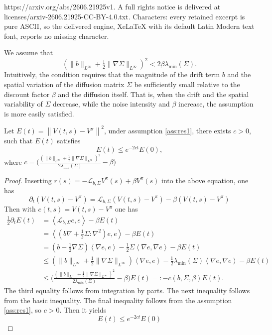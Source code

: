 \documentclass[10pt,a4paper]{amsart}
\def\lam{\lambda}
\def\la{\left\langle}
\def\ll{\left\lVert}
\def\mL{\mathcal{L}_{b,\Sigma}}
\def\pt{\partial}
\def\ra{\right\rangle}
\def\rl{\right\rVert}
\begin{document}
https://arxiv.org/abs/2606.21925v1. A full rights notice is delivered at licenses/arxiv-2606.21925-CC-BY-4.0.txt. Characters: every retained excerpt is pure ASCII, so the delivered engine, XeLaTeX with its default Latin Modern text font, reports no missing character.
\begin{assumption}\label{ass:res1}
We assume that
\[
   \left( \|b\|_{L^\infty} + \tfrac{1}{2} \|\nabla\Sigma\|_{L^\infty}\right)^2 
   < 2\beta \lambda_{\min}(\Sigma).
\]
Intuitively, the condition requires that the magnitude of the drift term $b$ and the spatial variation of the diffusion matrix $\Sigma$ be sufficiently small relative to the discount factor $\beta$ and the diffusion itself. That is, when the drift and the spatial variability of $\Sigma$ decrease, while the noise intensity and $\beta$ increase, the assumption is more easily satisfied.

\end{assumption}

\begin{lemma}
    Let $E(t) = \ll V(t,s)- V^\pi \rl^2$, under assumption \ref{ass:res1}, there exists $c > 0$, such that $E(t)$ satisfies
    \[
    E(t) \leq e^{-2c t}E(0),
    \]
    where $c = \bigg(\frac{(\|b\|_{L^\infty} + \tfrac{1}{2} \|\nabla\Sigma\|_{L^\infty})^2}{2\lam_{\min}(\Sigma)} - \beta \bigg)$
\end{lemma}

\begin{proof}
    Inserting $r(s) = -\mL V^\pi(s) + \beta V^\pi(s)$ into the above equation, one has
\[
\pt_t (V(t,s)- V^\pi ) = \mL (V(t,s)-V^\pi) - \beta (V(t,s) - V^\pi)
\]
Then with $e(t,s) =V(t,s)- V^\pi$ one has
\begin{align*}
    \frac12\pt_t E(t) &= \la\mL e, e\ra - \beta E(t) \\
                      &= \la(b\nabla + \frac{1}{2}\Sigma:\nabla^2) e, e\ra - \beta E(t)\\
                      &= (b - \frac{1}{2}\nabla\Sigma)\la\nabla e, e\ra-\frac{1}{2}\Sigma\la\nabla e, \nabla e\ra-\beta E(t)\\
                      &\leq (\|b\|_{L^\infty} + \tfrac{1}{2} \|\nabla\Sigma\|_{L^\infty})\la\nabla e, e\ra -\frac{1}{2}\lam_{\min}(\Sigma)\la\nabla e, \nabla e\ra-\beta E(t)\\
                      &\leq \bigg(\frac{(\|b\|_{L^\infty} + \tfrac{1}{2} \|\nabla\Sigma\|_{L^\infty})^2}{2\lam_{\min}(\Sigma)} - \beta \bigg)E(t) =:-c(b,\Sigma,\beta)E(t).  
\end{align*}
The third equality follows from integration by parts. The next inequality follows from the basic inequality. The final inequality follows from the assumption \ref{ass:res1}, so $c >0$.
Then it yields
\[
E(t) \leq e^{-2ct}E(0)
\]
\end{proof}
\end{document}
